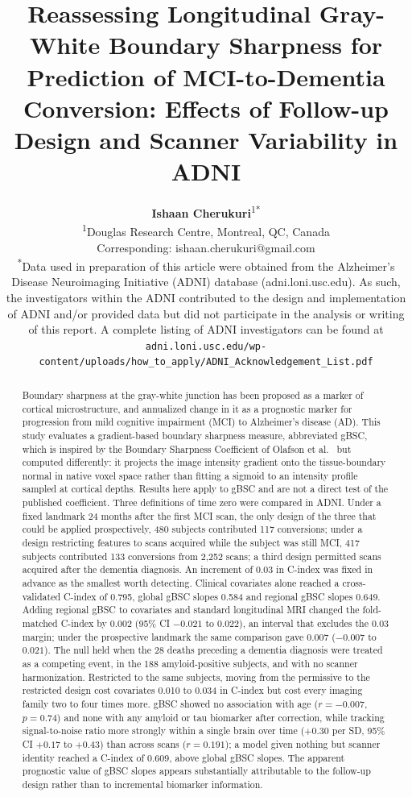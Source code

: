 \documentclass[blue]{ludusofficial}  %
\title{Reassessing Longitudinal Gray-White Boundary Sharpness for Prediction of MCI-to-Dementia Conversion: Effects of Follow-up Design and Scanner Variability in ADNI}
\author{%
    \textbf{Ishaan Cherukuri}\textsuperscript{1}\textsuperscript{*}\\[0.2cm]
    \small\textsuperscript{1}Douglas Research Centre, Montreal, QC, Canada\\
    \small Corresponding: ishaan.cherukuri@gmail.com\\[0.4cm]
    \small\textsuperscript{*}Data used in preparation of this article were obtained from the Alzheimer's Disease Neuroimaging Initiative (ADNI) database (adni.loni.usc.edu). As such, the investigators within the ADNI contributed to the design and implementation of ADNI and/or provided data but did not participate in the analysis or writing of this report. A complete listing of ADNI investigators can be found at \texttt{adni.loni.usc.edu/\allowbreak wp-content/\allowbreak uploads/\allowbreak how\_to\_apply/\allowbreak ADNI\_Acknowledgement\_List.pdf}
}
\begin{document}
\begin{abstract}
Boundary sharpness at the gray-white junction has been proposed as a marker of cortical microstructure, and annualized change in it as a prognostic marker for progression from mild cognitive impairment (MCI) to Alzheimer's disease (AD). This study evaluates a gradient-based boundary sharpness measure, abbreviated gBSC, which is inspired by the Boundary Sharpness Coefficient of Olafson et al.~\cite{olafson2021bsc} but computed differently: it projects the image intensity gradient onto the tissue-boundary normal in native voxel space rather than fitting a sigmoid to an intensity profile sampled at cortical depths. Results here apply to gBSC and are not a direct test of the published coefficient. Three definitions of time zero were compared in ADNI. Under a fixed landmark 24 months after the first MCI scan, the only design of the three that could be applied prospectively, 480 subjects contributed 117 conversions; under a design restricting features to scans acquired while the subject was still MCI, 417 subjects contributed 133 conversions from 2,252 scans; a third design permitted scans acquired after the dementia diagnosis. An increment of 0.03 in C-index was fixed in advance as the smallest worth detecting. Clinical covariates alone reached a cross-validated C-index of 0.795, global gBSC slopes 0.584 and regional gBSC slopes 0.649. Adding regional gBSC to covariates and standard longitudinal MRI changed the fold-matched C-index by 0.002 (95\% CI $-0.021$ to $0.022$), an interval that excludes the 0.03 margin; under the prospective landmark the same comparison gave 0.007 ($-0.007$ to $0.021$). The null held when the 28 deaths preceding a dementia diagnosis were treated as a competing event, in the 188 amyloid-positive subjects, and with no scanner harmonization. Restricted to the same subjects, moving from the permissive to the restricted design cost covariates 0.010 to 0.034 in C-index but cost every imaging family two to four times more. gBSC showed no association with age ($r=-0.007$, $p=0.74$) and none with any amyloid or tau biomarker after correction, while tracking signal-to-noise ratio more strongly within a single brain over time ($+0.30$ per SD, 95\% CI $+0.17$ to $+0.43$) than across scans ($r=0.191$); a model given nothing but scanner identity reached a C-index of 0.609, above global gBSC slopes. The apparent prognostic value of gBSC slopes appears substantially attributable to the follow-up design rather than to incremental biomarker information.
\end{abstract}
\end{document}
